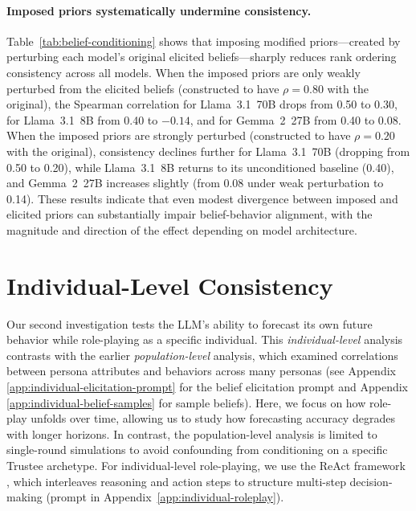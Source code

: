 \documentclass{article} %
\begin{document}
\paragraph{Imposed priors systematically undermine consistency.}
Table~\ref{tab:belief-conditioning} shows that imposing modified priors—created by perturbing each model’s original elicited beliefs—sharply reduces rank ordering consistency across all models. When the imposed priors are only weakly perturbed from the elicited beliefs (constructed to have $\rho=0.80$ with the original), the Spearman correlation for Llama~3.1~70B drops from 0.50 to 0.30, for Llama~3.1~8B from 0.40 to $-0.14$, and for Gemma~2~27B from 0.40 to 0.08. When the imposed priors are strongly perturbed (constructed to have $\rho=0.20$ with the original), consistency declines further for Llama~3.1~70B (dropping from 0.50 to 0.20), while Llama~3.1~8B returns to its unconditioned baseline (0.40), and Gemma~2~27B increases slightly (from 0.08 under weak perturbation to 0.14). These results indicate that even modest divergence between imposed and elicited priors can substantially impair belief-behavior alignment, with the magnitude and direction of the effect depending on model architecture.




\section{Individual-Level Consistency}
\label{sec:individual-level}

Our second investigation tests the LLM's ability to forecast its own future behavior while role-playing as a specific individual. This \textit{individual-level} analysis contrasts with the earlier \textit{population-level} analysis, which examined correlations between persona attributes and behaviors across many personas (see Appendix \ref{app:individual-elicitation-prompt} for the belief elicitation prompt and  Appendix \ref{app:individual-belief-samples} for sample beliefs). Here, we focus on how role-play unfolds over time, allowing us to study how forecasting accuracy degrades with longer horizons. In contrast, the population-level analysis is limited to single-round simulations to avoid confounding from conditioning on a specific Trustee archetype. For individual-level role-playing, we use the ReAct framework \citep{yao_react_2023}, which interleaves reasoning and action steps to structure multi-step decision-making (prompt in Appendix~\ref{app:individual-roleplay}).
\end{document}
